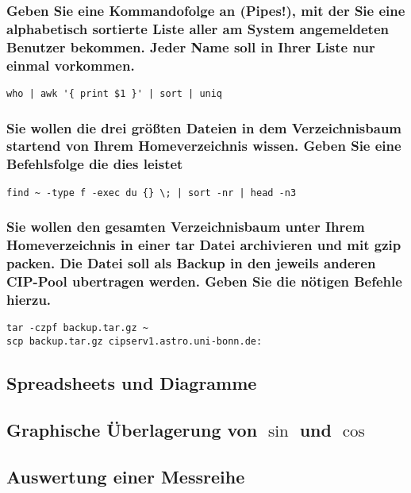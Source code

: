 \subsubsection*{Geben Sie eine Kommandofolge an (Pipes!), mit der Sie eine
alphabetisch sortierte Liste aller am System angemeldeten Benutzer bekommen.
Jeder Name soll in Ihrer Liste nur einmal vorkommen.}
\begin{lstlisting}
who | awk '{ print $1 }' | sort | uniq
\end{lstlisting}

\subsubsection*{Sie wollen die drei größten Dateien in dem Verzeichnisbaum
startend von Ihrem Homeverzeichnis wissen. Geben Sie eine Befehlsfolge die dies
leistet}
\begin{lstlisting}
find ~ -type f -exec du {} \; | sort -nr | head -n3
\end{lstlisting}

\subsubsection*{Sie wollen den gesamten Verzeichnisbaum unter Ihrem
Homeverzeichnis in einer tar Datei archivieren und mit gzip packen. Die Datei
soll als Backup in den jeweils anderen CIP-Pool ubertragen werden. Geben Sie die
nötigen Befehle hierzu.}
\begin{lstlisting}
tar -czpf backup.tar.gz ~
scp backup.tar.gz cipserv1.astro.uni-bonn.de:
\end{lstlisting}

\subsection{Spreadsheets und Diagramme}

\begin{figure}[h!]
  \begin{center}
  \end{center}
\end{figure}

\subsection{Graphische Überlagerung von $\sin$ und $\cos$}

\subsection{Auswertung einer Messreihe}

